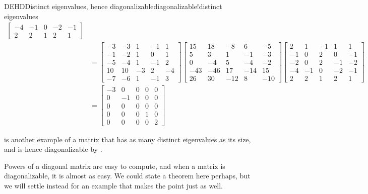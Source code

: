 \begin{example}{DEHD}{Distinct eigenvalues, hence diagonalizable}{diagonalizable!distinct eigenvalues}
\begin{align*}
\begin{bmatrix}
-4 & -1 & 0 & -2 & -1\\
2 & 2 & 1 & 2 & 1
\end{bmatrix}\\
%
&=
\begin{bmatrix}
-3 & -3 & 1 & -1 & 1\\
-1 & -2 & 1 & 0 & 1\\
-5 & -4 & 1 & -1 & 2\\
10 & 10 & -3 & 2 & -4\\
-7 & -6 & 1 & -1 & 3
\end{bmatrix}
\begin{bmatrix}
15 & 18 & -8 & 6 & -5\\
5 & 3 & 1 & -1 & -3\\
0 & -4 & 5 & -4 & -2\\
-43 & -46 & 17 & -14 & 15\\
26 & 30 & -12 & 8 & -10
\end{bmatrix}
\begin{bmatrix}
2 & 1 & -1 & 1 & 1\\
-1 & 0 & 2 & 0 & -1\\
-2 & 0 & 2 & -1 & -2\\
-4 & -1 & 0 & -2 & -1\\
2 & 2 & 1 & 2 & 1
\end{bmatrix}\\
%
&=
\begin{bmatrix}
-3 & 0 & 0 & 0 & 0\\
0 & -1 & 0 & 0 & 0\\
0 & 0 & 0 & 0 & 0\\
0 & 0 & 0 & 1 & 0\\
0 & 0 & 0 & 0 & 2
\end{bmatrix}
%
\end{align*}
%
\end{example}
%
 is another example of a matrix that has as many distinct eigenvalues as its size, and is hence diagonalizable by .\par
%
Powers of a diagonal matrix are easy to compute, and when a matrix is diagonalizable, it is almost as easy.  We could state a theorem here perhaps, but we will settle instead for an example that makes the point just as well.\par
%
%
